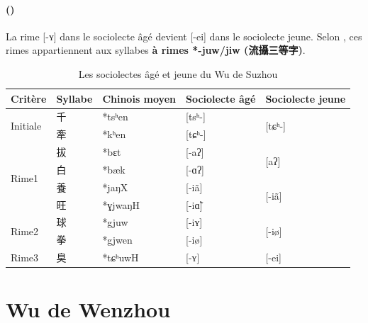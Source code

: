 \documentclass{scrbook}
\newcounter{c}[subsubsection]
\newcommand{\stpc}[1]{\stepcounter{#1}}
\newcommand{\difwenbai}{couches archaïque et récente\xspace}
\newcommand{\diflaoxin}{sociolectes âgé et jeune\xspace}
\newcommand{\iso}{syllabes isolées\xspace}
\newcommand{\termyyx}[1]{\textbf{#1}}
\newcommand{\exclure}[1]{Il faut d'abord exclure les syllabes #1 avant d'identifier les \difwenbai}
\begin{document}
\begin{sloppypar}
\stpc{c}\paragraph{()}
La rime [-ʏ] dans le sociolecte âgé devient [-ei] dans le sociolecte jeune. Selon \textcite[28-33]{Wang1996suzhou}, ces rimes appartiennent aux syllabes \termyyx{à rimes *-juw/jiw (流攝三等字)}.

\begin{table}[htbp]
  \centering
    \begin{tabular}{lllll}
    \toprule
    Critère & Syllabe & Chinois moyen  & Sociolecte âgé & Sociolecte jeune \\
    \midrule
    \multirow{2}[2]{*}{Initiale} & 千     & *tsʰen & [tsʰ-] & \multirow{2}[2]{*}{[tɕʰ-]} \\
          & 牽     & *kʰen & [tɕʰ-] &  \\
    \midrule
    \multirow{4}[2]{*}{Rime1} & 拔     & *bɛt  & [-aʔ] & \multirow{2}[1]{*}{[aʔ]} \\
          & 白     & *bæk  & [-ɑʔ] &  \\
          & 養     & *jaŋX & [-iã] & \multirow{2}[1]{*}{[-iã]} \\
          & 旺     & *ɣjwaŋH & [-iɑ̃] &  \\
    \midrule
    \multirow{2}[2]{*}{Rime2} & 球     & *gjuw & [-iʏ] & \multirow{2}[2]{*}{[-iø]} \\
          & 拳     & *gjwen & [-iø] &  \\
    \midrule
    Rime3 & 臭     & *tɕʰuwH & [-ʏ]  & [-ei] \\
    \bottomrule
    \end{tabular}%
  \caption{Les \diflaoxin du Wu de Suzhou}
  \label{tab:Suzhou2}%
\end{table}%


\section{Wu de Wenzhou}


\end{sloppypar}
\end{document}

